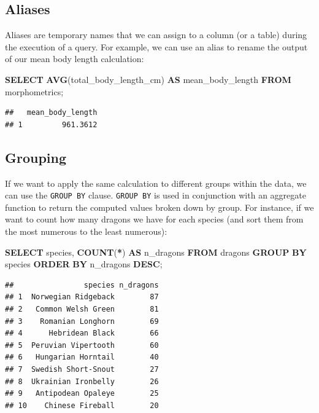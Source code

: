 \documentclass[
]{book}
\newenvironment{Shaded}{\begin{snugshade}}{\end{snugshade}}
\newcommand{\FunctionTok}[1]{\textcolor[rgb]{0.13,0.29,0.53}{\textbf{#1}}}
\newcommand{\KeywordTok}[1]{\textcolor[rgb]{0.13,0.29,0.53}{\textbf{#1}}}
\newcommand{\NormalTok}[1]{#1}
\newcommand{\OperatorTok}[1]{\textcolor[rgb]{0.81,0.36,0.00}{\textbf{#1}}}
\begin{document}
\hypertarget{aliases}{%
\subsection{Aliases}\label{aliases}}

Aliases are temporary names that we can assign to a column (or a table) during
the execution of a query. For example, we can use an alias to rename the output
of our mean body length calculation:

\begin{Shaded}
\begin{Highlighting}[]
\KeywordTok{SELECT} \FunctionTok{AVG}\NormalTok{(total\_body\_length\_cm) }\KeywordTok{AS}\NormalTok{ mean\_body\_length}
\KeywordTok{FROM}\NormalTok{ morphometrics;}
\end{Highlighting}
\end{Shaded}

\begin{verbatim}
##   mean_body_length
## 1         961.3612
\end{verbatim}

\hypertarget{grouping}{%
\subsection{Grouping}\label{grouping}}

If we want to apply the same calculation to different groups within the data,
we can use the \texttt{GROUP\ BY} clause. \texttt{GROUP\ BY} is used in conjunction with an
aggregate function to return the computed values broken down by group. For
instance, if we want to count how many dragons we have for each species (and
sort them from the most numerous to the least numerous):

\begin{Shaded}
\begin{Highlighting}[]
\KeywordTok{SELECT}\NormalTok{ species, }\FunctionTok{COUNT}\NormalTok{(}\OperatorTok{*}\NormalTok{) }\KeywordTok{AS}\NormalTok{ n\_dragons}
\KeywordTok{FROM}\NormalTok{ dragons}
\KeywordTok{GROUP} \KeywordTok{BY}\NormalTok{ species}
\KeywordTok{ORDER} \KeywordTok{BY}\NormalTok{ n\_dragons }\KeywordTok{DESC}\NormalTok{;}
\end{Highlighting}
\end{Shaded}

\begin{verbatim}
##                species n_dragons
## 1  Norwegian Ridgeback        87
## 2   Common Welsh Green        81
## 3    Romanian Longhorn        69
## 4      Hebridean Black        66
## 5  Peruvian Vipertooth        60
## 6   Hungarian Horntail        40
## 7  Swedish Short-Snout        27
## 8  Ukrainian Ironbelly        26
## 9   Antipodean Opaleye        25
## 10    Chinese Fireball        20
\end{verbatim}
\end{document}
